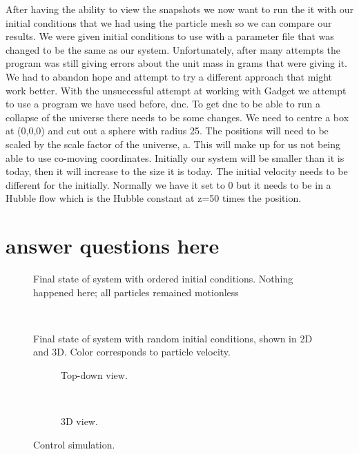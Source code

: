 \documentclass[10pt]{article}
\begin{document}
After having the ability to view the snapshots we now want to run the it with our initial conditions that we had using the particle mesh so we can compare our results. We were given initial conditions to use with a parameter file that was changed to be the same as our system. Unfortunately, after many attempts the program was still giving errors about the unit mass in grams that were giving it. We had to abandon hope and attempt to try a different approach that might work better. With the unsuccessful attempt at working with Gadget we attempt to use a program we have used before, dnc. 
	To get dnc to be able to run a collapse of the universe there needs to be some changes. We need to centre a box at (0,0,0) and cut out a sphere with radius 25.  The positions will need to be scaled by the scale factor of the universe, a. This will make up for us not being able to use co-moving coordinates. Initially our system will be smaller than it is today, then it will increase to the size it is today. The initial velocity needs to be different for the initially. Normally we have it set to 0 but it needs to be in a Hubble flow which is the Hubble constant at z=50 times the position. 
\section{answer questions here}
\begin{figure}[htbp]
\centering

\caption{Final state of system with ordered initial conditions. Nothing happened here; all particles remained motionless}
\end{figure}

\begin{figure}[htbp]
\centering
\begin{subfigure}{\textwidth}
\centering

\end{subfigure} \\
\begin{subfigure}{\textwidth}
\centering

\end{subfigure}
\caption{Final state of system with random initial conditions, shown in 2D and 3D. Color corresponds to particle velocity.}
\end{figure}

\begin{figure}[htbp]
\centering
\begin{subfigure}{\textwidth}
\centering

\caption{Top-down view.}
\end{subfigure} \\
\begin{subfigure}{\textwidth}
\centering

\caption{3D view.}
\end{subfigure}
\caption{Control simulation.}
\end{figure}
\end{document}
